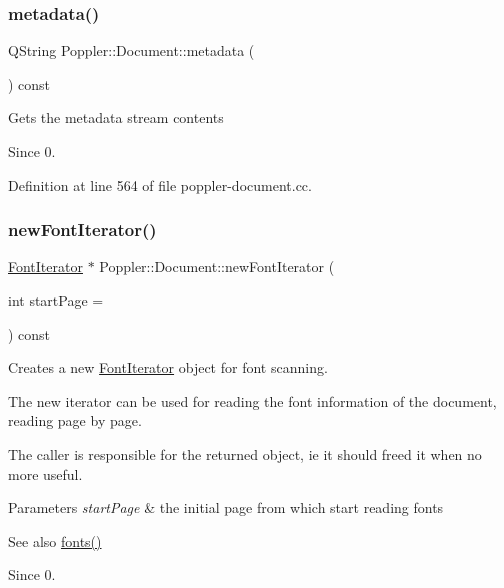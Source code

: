 \subsubsection{\texorpdfstring{metadata()}{metadata()}}
{\footnotesize\ttfamily Q\+String Poppler\+::\+Document\+::metadata (\begin{DoxyParamCaption}{ }\end{DoxyParamCaption}) const}

Gets the metadata stream contents

\begin{DoxySince}{Since}
0. 
\end{DoxySince}


Definition at line 564 of file poppler-\/document.\+cc.

\mbox{\label{class_poppler_1_1_document_ab7554a98e1cd7b472fe4f1e33565581b}} 
\subsubsection{\texorpdfstring{new\+Font\+Iterator()}{newFontIterator()}}
{\footnotesize\ttfamily \hyperlink{class_poppler_1_1_font_iterator}{Font\+Iterator} $\ast$ Poppler\+::\+Document\+::new\+Font\+Iterator (\begin{DoxyParamCaption}\item[{int}]{start\+Page = {} }\end{DoxyParamCaption}) const}

Creates a new \hyperlink{class_poppler_1_1_font_iterator}{Font\+Iterator} object for font scanning.

The new iterator can be used for reading the font information of the document, reading page by page.

The caller is responsible for the returned object, ie it should freed it when no more useful.


\begin{DoxyParams}{Parameters}
{\em start\+Page} & the initial page from which start reading fonts\\
\hline
\end{DoxyParams}
\begin{DoxySeeAlso}{See also}
\hyperlink{class_poppler_1_1_document_ad08deee0fbcf175c979c6057f78bded6}{fonts()}
\end{DoxySeeAlso}
\begin{DoxySince}{Since}
0. 
\end{DoxySince}


